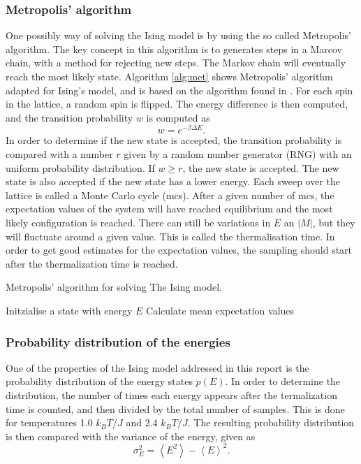 \subsubsection{Metropolis' algorithm}
One possibly way of solving the Ising model is by using the so called Metropolis' algorithm. The key concept in this algorithm is to generates steps in a Marcov chain, with a method for rejecting new steps. The Markov chain will eventually reach the most likely state. Algorithm \ref{alg:met} shows Metropolis' algorithm adapted for Ising's model, and is based on the algorithm found in \cite{lecturenotes}. For each spin in the lattice, a random spin is flipped. The energy difference is then computed, and the transition probability $w$ is computed as
\begin{equation}
w=e^{- \beta \Delta E }.
\end{equation}
In order to determine if the new state is accepted, the transition probability
is compared with a number $r$ given by a random number generator (RNG) with an uniform probability distribution. If $w \geq r$, the new state is accepted. The new state is also accepted if the new state has a lower energy. Each sweep over the lattice is called a Monte Carlo cycle (mcs). After a given number of mcs, the expectation values of the system will have reached equilibrium and the most likely configuration is reached. There can still be variations in $E$ an $|M|$, but they will fluctuate around a given value. This is called the thermalisation time. In order to get good estimates for the expectation values, the sampling should start after the thermalization time is reached. 


\begin{algorithm}[htbp]\label{alg:met}\caption{Metropolis' algorithm for solving The Ising model.}
	\SetAlgoLined
	\BlankLine
	\BlankLine
	Initzialise a state with energy $E$\;
	Calculate mean expectation values\;	
	\BlankLine
	\BlankLine
\end{algorithm}

\subsubsection{Probability distribution of the energies}
One of the properties of the Ising model addressed in this report is the probability distribution of the energy states $p(E)$. In order to determine the distribution, the number of times each energy appears after the termalization time is counted, and then divided by the total number of samples. This is done for temperatures 1.0 $k_BT/J$ and 2.4 $k_BT/J$. The resulting probability distribution is then compared with the variance of the energy, given as
\begin{equation}
 \sigma_E^2 = \left\langle E^2\right\rangle - \left\langle E\right\rangle^2 .
\end{equation}  
 
